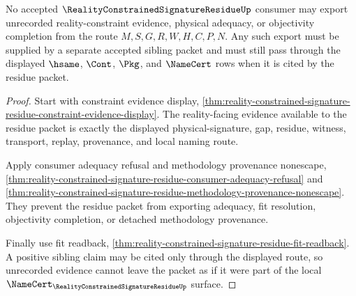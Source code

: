 \begin{theorem}
\label{thm:reality-constrained-signature-residue-unrecorded-evidence-nonescape}
No accepted $\RealityConstrainedSignatureResidueUp$ consumer may export unrecorded reality-constraint evidence, physical adequacy, or objectivity completion from the route $M,S,G,R,W,H,C,P,N$. Any such export must be supplied by a separate accepted sibling packet and must still pass through the displayed $\hsame$, $\Cont$, $\Pkg$, and $\NameCert$ rows when it is cited by the residue packet.
\end{theorem}
\begin{proof}
Start with constraint evidence display, \autoref{thm:reality-constrained-signature-residue-constraint-evidence-display}. The reality-facing evidence available to the residue packet is exactly the displayed physical-signature, gap, residue, witness, transport, replay, provenance, and local naming route.

Apply consumer adequacy refusal and methodology provenance nonescape, \autoref{thm:reality-constrained-signature-residue-consumer-adequacy-refusal} and \autoref{thm:reality-constrained-signature-residue-methodology-provenance-nonescape}. They prevent the residue packet from exporting adequacy, fit resolution, objectivity completion, or detached methodology provenance.

Finally use fit readback, \autoref{thm:reality-constrained-signature-residue-fit-readback}. A positive sibling claim may be cited only through the displayed route, so unrecorded evidence cannot leave the packet as if it were part of the local $\NameCert_{\RealityConstrainedSignatureResidueUp}$ surface.
\end{proof}

